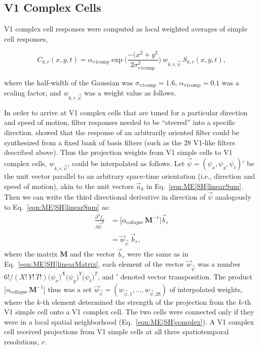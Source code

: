 \subsection{V1 Complex Cells}
\label{sec:ME|V1|complex}

V1 complex cell responses were computed as
local weighted averages of simple cell responses,

\begin{equation}
C_{k,r}(x,y,t) = \alpha_{\textrm{v1comp}}
	\exp \Big( \frac{-(x^2+y^2}{2\sigma_{\textrm{v1comp}}^2} \Big)
    \: w_{k,r,\vec{\psi}}\: S_{k,r}(x,y,t),
\label{eqn:ME|SH|complex}
\end{equation}

where the half-width of the Gaussian was 
$\sigma_{\textrm{v1comp}}=1.6$,
$\alpha_{\textrm{v1comp}}=0.1$ was a scaling factor,
and $w_{k,r,\vec{\psi}}$ was a weight value as follows.

In order to arrive at \ac{V1} complex cells that are tuned for a
particular direction and speed of motion, filter responses
needed to be ``steered'' into a specific direction.
\cite{FreemanAdelson1991} showed that the response of an arbitrarily oriented
filter could be synthesized from a fixed bank of basis filters 
(such as the $28$ \ac{V1}-like filters described above).
Thus the projection weights from \ac{V1} simple cells to \ac{V1} complex cells,
$w_{k,r,\vec{\psi}}$, could be interpolated as follows.
Let $\vec{\psi} = (\psi_x,\psi_y,\psi_t)'$ be the unit vector parallel to
an arbitrary space-time orientation (i.e., direction and speed of motion),
akin to the unit vectors $\vec{u}_k$ in Eq.~\ref{eqn:ME|SH|linearSum}.
Then we can write the third directional derivative in direction of $\vec{\psi}$
analogously to Eq.~\ref{eqn:ME|SH|linearSum} as:
\begin{align}
\frac{\partial^3 f_r}{\partial \vec{\psi}^3} & =
	\Big[ \alpha_{\textrm{collapse}}\, \textbf{M}^{-1} \Big]
    \vec{b}_r \\
    & = \vec{w}_{\vec{\psi}}\: \vec{b}_r,
\label{eqn:ME|SH|interpolation}
\end{align}
where the matrix \textbf{M} and the vector $\vec{b}_r$ were the same as in 
Eq.~\ref{eqn:ME|SH|linearMatrix}, each element of the vector $\vec{w}_{\vec{\psi}}$
was a number 
$6!/(X!\, Y!\, T!) \big(\psi_{x}\big)^X
	\big(\psi_{y}\big)^Y
    \big(\psi_{t}\big)^T$,
and $'$ denoted vector transposition.
The product $\Big[ \alpha_{\textrm{collapse}}\, \textbf{M}^{-1} \Big]$ thus was a
set $\vec{w}_{\vec{\psi}} = (w_{\vec{\psi},1}, \ldots, w_{\vec{\psi},28})$ of
interpolated weights, where the $k$-th element determined the strength of the
projection from the $k$-th \ac{V1} simple cell onto a \ac{V1} complex cell.
The two cells were connected only if they were in a local spatial neighborhood
(Eq.~\ref{eqn:ME|SH|complex}).
A \ac{V1} complex cell received projections from \ac{V1} simple cells at all 
three spatiotemporal resolutions, $r$.


